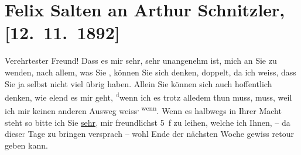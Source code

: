 

\renewcommand{\erwaehntePersonen}{Personen: Julius Bauer, Paul Horn}
\renewcommand{\erwaehnteOrte}{Orte: Café Pfob, Café Union, Riedhof, Volkstheater, Wien}
\renewcommand{\erwaehnteWerke}{Werke: ?? [Feuilleton], Musotte, Tagebuch}
\section[Felix Salten an Arthur Schnitzler, {[}12. 11. 1892{]}]{Felix Salten an Arthur Schnitzler, {[}12. 11. 1892{]}}
\nopagebreak{}
\rehead{ }\normalsize\beginnumbering{}
\toendnotes[C]{\smallbreak\pagebreak[2]}
\toendnotes[C]{\smallbreak}
\pstart
           \noindent{}{\pb}Verehrtester Freund! Dass es mir sehr, sehr unangenehm
               ist, mich an Sie zu wenden, nach allem, was Sie \label{K_L03117-1v}\label{K_L03117-1h}, können Sie sich denken, doppelt, da ich weiss, dass Sie ja selbst nicht viel
               übrig haben. Allein Sie können sich auch hoffentlich denken, wie elend es mir geht, \substVorne{}\textsuperscript{\textcolor{gray}{d}}\substDazwischen{}w\substHinten{}enn ich es trotz alledem thun muss, muss, weil ich mir keinen anderen Ausweg
               weiss\substVorne{}\textsuperscript{, wenn}{\allowbreak}\substDazwischen{}. Wenn\substHinten{} es halbwegs in Ihrer Macht steht so
               bitte ich Sie \uline{sehr}\textcolor{gray}{,} mir freundlichst 5 f zu leihen, welche ich {\pb}Ihnen, – da \label{K_L03117-2v}\label{K_L03117-2h} diese\textcolor{gray}{r} Tage zu bringen
               versprach – wohl Ende der nächsten Woche \introOben{}gewiss\introOben{} retour geben
               kann.\pend
           
